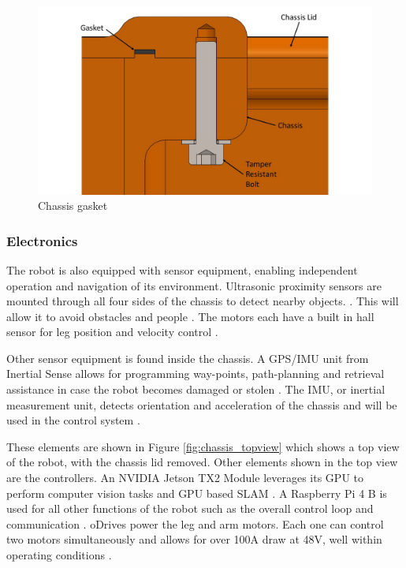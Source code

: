 \begin{figure}
    \centering
    \includegraphics[width=\textwidth]{2_ProposedDesign/img/LidSectionA.jpg}
    \caption{Chassis gasket}
    \label{fig:gasket}
\end{figure}

\subsubsection{Electronics}

The robot is also equipped with sensor equipment, enabling independent operation and navigation of its environment. Ultrasonic proximity sensors are mounted through all four sides of the chassis to detect nearby objects. \cite{maxbotixs_mb7395_2017}. This will allow it to avoid obstacles and people \cite{corrigan_12_2019}. The motors each have a built in hall sensor for leg position and velocity control \cite{maxon_motor_maxon_2014}.


Other sensor equipment is found inside the chassis. 
A GPS/IMU unit from Inertial Sense allows for programming way-points, path-planning and retrieval assistance in case the robot becomes damaged or stolen \cite{inertial_sense_ins+rtk_2019}.
The IMU, or inertial measurement unit, detects orientation and acceleration of the chassis and will be used in the control system \cite{unmanned_systems_technology_selecting_2018}.

These elements are shown in Figure \ref{fig:chassis_topview} which shows a top view of the robot, with the chassis lid removed. Other elements shown in the top view are the controllers. An NVIDIA Jetson TX2 Module leverages its GPU to perform computer vision tasks and GPU based SLAM \cite{nvidia_jetson_2015} \cite{larabel_benchmarks_2017}. A Raspberry Pi 4 B is used for all other functions of the robot such as the overall control loop and communication \cite{raspberry_pi_raspberry_nodate} \cite{raspi.tv_how_2019}. oDrives power the leg and arm motors. Each one can control two motors simultaneously and allows for over 100A draw at 48V, well within operating conditions \cite{weigl_madcowswe/odrivehardware_2019}.


